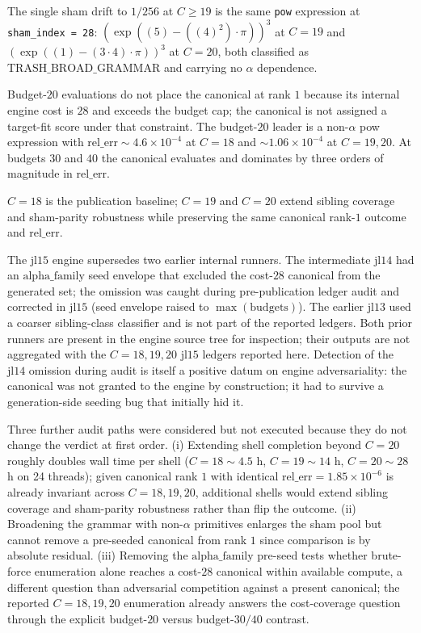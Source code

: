 \documentclass[
  11pt,
  letterpaper,
  twocolumn,
]{article}
\begin{document}
The single sham drift to \(1/256\) at \(C \ge 19\) is the same
\texttt{pow} expression at \texttt{sham\_index\ =\ 28}:
\((\exp((5)-((4)^2)\!\cdot\!\pi))^3\) at \(C\!=\!19\) and
\((\exp((1)-(3\!\cdot\!4)\!\cdot\!\pi))^3\) at \(C\!=\!20\), both
classified as \(\mathrm{TRASH\_BROAD\_GRAMMAR}\) and carrying no
\(\alpha\) dependence.

Budget-\(20\) evaluations do not place the canonical at rank \(1\)
because its internal engine cost is \(28\) and exceeds the budget cap;
the canonical is not assigned a target-fit score under that constraint.
The budget-\(20\) leader is a non-\(\alpha\) pow expression with
\(\mathrm{rel\_err}\!\sim\!4.6\!\times\!10^{-4}\) at \(C\!=\!18\) and
\(\sim\!1.06\!\times\!10^{-4}\) at \(C\!=\!19,20\). At budgets \(30\)
and \(40\) the canonical evaluates and dominates by three orders of
magnitude in \(\mathrm{rel\_err}\).

\(C\!=\!18\) is the publication baseline; \(C\!=\!19\) and \(C\!=\!20\)
extend sibling coverage and sham-parity robustness while preserving the
same canonical rank-\(1\) outcome and \(\mathrm{rel\_err}\).

The \(\mathrm{jl15}\) engine supersedes two earlier internal runners.
The intermediate \(\mathrm{jl14}\) had an \(\mathrm{alpha\_family}\)
seed envelope that excluded the cost-\(28\) canonical from the generated
set; the omission was caught during pre-publication ledger audit and
corrected in \(\mathrm{jl15}\) (seed envelope raised to
\(\max(\mathrm{budgets})\)). The earlier \(\mathrm{jl13}\) used a
coarser sibling-class classifier and is not part of the reported
ledgers. Both prior runners are present in the engine source tree for
inspection; their outputs are not aggregated with the \(C\!=\!18,19,20\)
\(\mathrm{jl15}\) ledgers reported here. Detection of the
\(\mathrm{jl14}\) omission during audit is itself a positive datum on
engine adversariality: the canonical was not granted to the engine by
construction; it had to survive a generation-side seeding bug that
initially hid it.

Three further audit paths were considered but not executed because they
do not change the verdict at first order. (i) Extending shell completion
beyond \(C\!=\!20\) roughly doubles wall time per shell
(\(C\!=\!18\!\sim\!4.5\) h, \(C\!=\!19\!\sim\!14\) h,
\(C\!=\!20\!\sim\!28\) h on 24 threads); given canonical rank \(1\) with
identical \(\mathrm{rel\_err}=1.85\!\times\!10^{-6}\) is already
invariant across \(C\!=\!18,19,20\), additional shells would extend
sibling coverage and sham-parity robustness rather than flip the
outcome. (ii) Broadening the grammar with non-\(\alpha\) primitives
enlarges the sham pool but cannot remove a pre-seeded canonical from
rank \(1\) since comparison is by absolute residual. (iii) Removing the
\(\mathrm{alpha\_family}\) pre-seed tests whether brute-force
enumeration alone reaches a cost-\(28\) canonical within available
compute, a different question than adversarial competition against a
present canonical; the reported \(C\!=\!18,19,20\) enumeration already
answers the cost-coverage question through the explicit budget-\(20\)
versus budget-\(30/40\) contrast.
\end{document}
